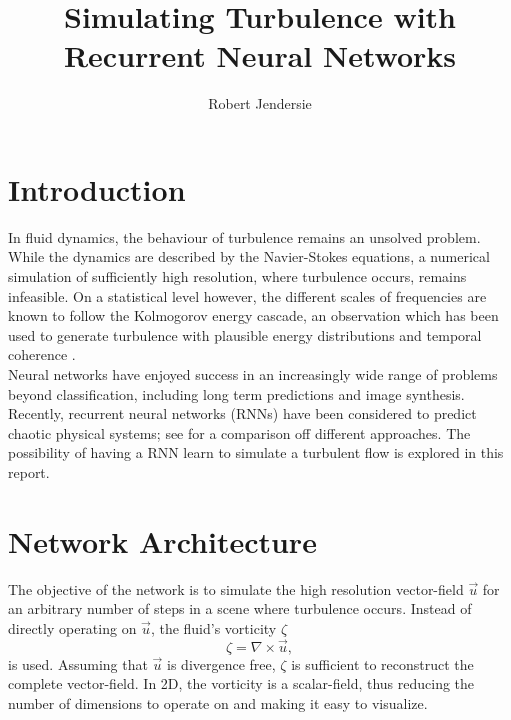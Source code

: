 \documentclass[sigconf]{acmart}
\newcommand{\curl}[1]{{\nabla} \times #1} %
\begin{document}
\title{Simulating Turbulence with Recurrent Neural Networks }
\subtitle{}

\author{Robert Jendersie}

\maketitle

\section{Introduction}
In fluid dynamics, the behaviour of turbulence remains an unsolved problem. While the dynamics are described by the Navier-Stokes equations, a numerical simulation of sufficiently high resolution, where turbulence occurs, remains infeasible. On a statistical level however, the different scales of frequencies are known to follow the Kolmogorov energy cascade, an observation which has been used to generate turbulence with plausible energy distributions and temporal coherence \cite{kim2008wavelet}. \\
Neural networks have enjoyed success in an increasingly wide range of problems beyond classification, including long term predictions and image synthesis.
Recently, recurrent neural networks (RNNs) have been considered to predict chaotic physical systems; see \cite{vlachas2019forecasting} for a comparison off different approaches.
The possibility of having a RNN learn to simulate a turbulent flow is explored in this report.
\section{Network Architecture}
The objective of the network is to simulate the high resolution vector-field $\vec{u}$ for an arbitrary number of steps in a scene where turbulence occurs.
Instead of directly operating on $\vec{u}$, the fluid's vorticity $\zeta$
\[
\zeta = \curl{\vec{u}},
\]
is used. Assuming that $\vec{u}$ is divergence free, $\zeta$ is sufficient to reconstruct the complete vector-field. In 2D, the vorticity is a scalar-field, thus reducing the number of dimensions to operate on and making it easy to visualize.
\end{document}

